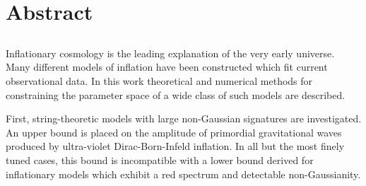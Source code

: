 \renewcommand{\CVSrevision}{\version$Id: abstract.tex,v 1.13 2009/11/26 16:18:26 ith Exp $}
% 
% 
\chapter*{Abstract}
\label{ch:abstract}
\section*{}
\singlespacing
Inflationary cosmology is the leading explanation of the very early universe. 
Many different models of inflation have been constructed which fit current observational data.
In this work theoretical and numerical methods for constraining the parameter space of a wide class
of such models are described.

First, string-theoretic models with large non-Gaussian signatures are investigated.
An upper bound is placed on the amplitude of primordial gravitational waves produced by ultra-violet
Dirac-Born-Infeld inflation. In all but the most finely tuned cases, this bound is
incompatible with
a lower bound derived for inflationary models which exhibit a red spectrum and detectable
non-Gaussianity. 

